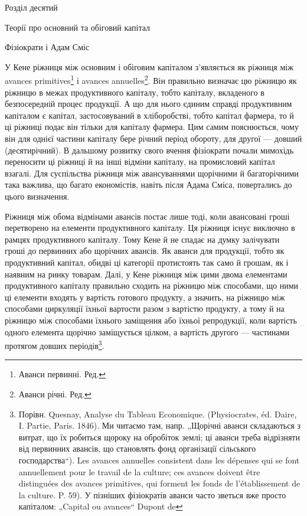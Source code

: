 Розділ десятий

Теорії про основний та обіговий капітал

Фізіократи і Адам Сміс

У Кене ріжниця між основним і обіговим капіталом з’являється як
ріжниця між avances primitives\footnote*{
Аванси первинні. Ред.
} і avances annuelles\footnote*{
Аванси річні. Ред.
}. Він правильно визначає
цю ріжницю як ріжницю в межах продуктивного капіталу, тобто
капіталу, вкладеного в безпосередній процес продукції. А що для нього
єдиним справді продуктивним капіталом є капітал, застосовуваний в хліборобстві,
тобто капітал фармера, то й ці ріжниці подає він тільки для
капіталу фармера. Цим самим пояснюється, чому він для однієї частини
капіталу бере річний період обороту, для другої — довший (десятирічний).
В дальшому розвитку свого вчення фізіократи почали мимохідь переносити
ці ріжниці й на інші відміни капіталу, на промисловий капітал взагалі.
Для суспільства ріжниця між авансуваннями щорічними й багаторічними
така важлива, що багато економістів, навіть після Адама Сміса,
повертались до цього визначення.

Ріжниця між обома відмінами авансів постає лише тоді, коли авансовані
гроші перетворено на елементи продуктивного капіталу. Ця ріжниця
існує виключно в рамцях продуктивного капіталу. Тому Кене й не спадає
на думку залічувати гроші до первинних або щорічних авансів. Як аванси
для продукції, тобто як продуктивний капітал, обидві ці категорії протистоять
так само й грошам, як і наявним на ринку товарам. Далі, у Кене
ріжниця між цими двома елементами продуктивного капіталу правильно
сходить на ріжницю між способами, що ними ці елементи входять у вартість
готового продукту, а значить, на ріжницю між способами циркуляції
їхньої вартости разом з вартістю продукту, а тому й на ріжницю
між способами їхнього заміщення або їхньої репродукції, коли вартість
одного елемента щорічно заміщується цілком, а вартість другого — частинами
протягом довших періодів\footnote{
Порівн. Quesnay, Analyse du Tableau Economique. (Physiocrates, éd. Daire,
I. Partie, Paris. 1846). Ми читаємо там, напр. „Щорічні аванси складаються з витрат,
що їх робиться щороку на обробіток землі; ці аванси треба відрізняти від первинних
авансів, що становлять фонд організації сільського господарства“). Les
avances annuelles consistent dans les dépenses qui se font annuellement pour le
travail de la culture; ces avances doivent être distinguées des avances primitives,
qui forment les fonds de l’établissement de la culture. P. 59). У пізніших фізіократів
аванси часто зветься вже просто капіталом: „Capital ou avances“ Dupont de
}.

